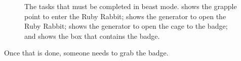 \documentclass[11pt]{article} %
\begin{document}
		\begin{figure}[b!]
		\centering
		\hfill
		\caption{
			The tasks that must be completed in beast mode.
			 shows the grapple point to enter the Ruby Rabbit;
			 shows the generator to open the Ruby Rabbit;
			 shows the generator to open the cage to the badge;
			and  shows the box that contains the badge.
			}
		\label{fig:cn}
	\end{figure}


	Once that is done, someone needs to grab the badge. \\
\end{document}
